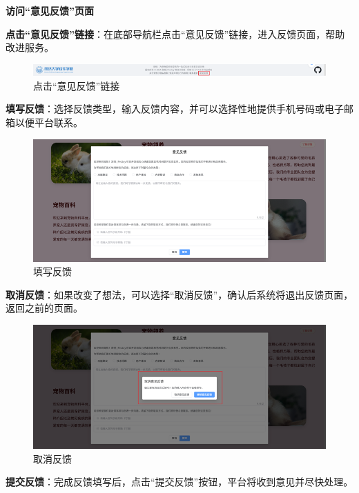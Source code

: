\begin{itemize}
	\textbf{访问“意见反馈”页面}

	\textbf{点击“意见反馈”链接}：在底部导航栏点击“意见反馈”链接，进入反馈页面，帮助改进服务。

	\begin{figure}[H]
		\centering
		\includegraphics[scale=0.8]{figures/FooterNavigationBar12.png} 
		\caption{点击“意见反馈”链接}
	\end{figure}
	
	\textbf{填写反馈}：选择反馈类型，输入反馈内容，并可以选择性地提供手机号码或电子邮箱以便平台联系。

	\begin{figure}[H]
		\centering
		\includegraphics[scale=0.8]{figures/FooterNavigationBar13.png} 
		\caption{填写反馈}
	\end{figure}

	\textbf{取消反馈}：如果改变了想法，可以选择“取消反馈”，确认后系统将退出反馈页面，返回之前的页面。

	\begin{figure}[H]
		\centering
		\includegraphics[scale=0.8]{figures/FooterNavigationBar14.png} 
		\caption{取消反馈}
	\end{figure}

	\textbf{提交反馈}：完成反馈填写后，点击“提交反馈”按钮，平台将收到意见并尽快处理。


\end{itemize}
